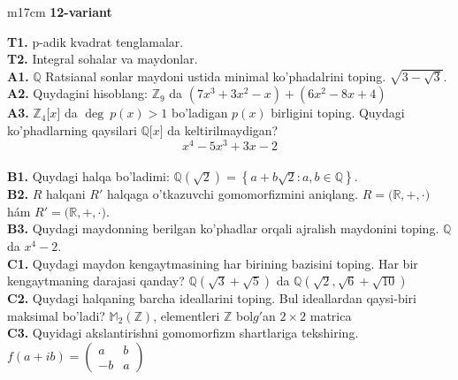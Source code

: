 \documentclass{article}
\begin{document}
\begin{tabular}{m{17cm}}
\textbf{12-variant}
\newline

\textbf{T1.} p-adik kvadrat tenglamalar. \\
\textbf{T2.} Integral sohalar va maydonlar. \\
\textbf{A1.} \(\mathbb{Q}\) Ratsianal sonlar maydoni ustida minimal ko'phadalrini toping.
\(\sqrt{3 - \sqrt{3}}\). \\
\textbf{A2.} Quydagini hisoblang:
\(\mathbb{Z}_{9}\) da \(\left( 7x^{3} + 3x^{2} - x \right) + \left( 6x^{2} - 8x + 4 \right)\) \\
\textbf{A3.} \(\mathbb{Z}_{4}\lbrack x\rbrack\) da \(\deg\ p(x) > 1\) bo'ladigan \(p(x)\) birligini toping. Quydagi ko'phadlarning qaysilari \(\mathbb{Q\lbrack}x\rbrack\) da keltirilmaydigan?
\[x^{4} - 5x^{3} + 3x - 2\] \\
\textbf{B1.} Quydagi halqa bo'ladimi:
\(\mathbb{Q}\left( \sqrt{2} \right) = \left\{ a + b\sqrt{2}:a,b \in \mathbb{Q} \right\}\). \\
\textbf{B2.} \(R\) halqani \(R'\) halqaga o'tkazuvchi gomomorfizmini aniqlang.
\(R\mathbb{= (R,} + , \cdot )\) hám \(R'\mathbb{= (R,} + , \cdot )\). \\
\textbf{B3.} Quydagi maydonning berilgan ko'phadlar orqali ajralish maydonini toping.
\(\mathbb{Q}\) da \(x^{4} - 2\). \\
\textbf{C1.} Quydagi maydon kengaytmasining har birining bazisini toping. Har bir kengaytmaning darajasi qanday?
\(\mathbb{Q}\left( \sqrt{3} + \sqrt{5} \right)\) da \(\mathbb{Q}\left( \sqrt{2},\sqrt{6} + \sqrt{10} \right)\) \\
\textbf{C2.} Quydagi halqaning barcha ideallarini toping. Bul ideallardan qaysi-biri maksimal bo'ladi?
\(\mathbb{M}_{2}\left( \mathbb{Z} \right)\), elementleri \(\mathbb{Z}\) bol\(g'\)an \(2 \times 2\) matrica \\
\textbf{C3.} Quyidagi akslantirishni gomomorfizm shartlariga tekshiring. \(f(a + ib) = \begin{pmatrix}
a & b \\
 - b & a
\end{pmatrix}\) \\

\end{tabular}
\vspace{1cm}
\end{document}
